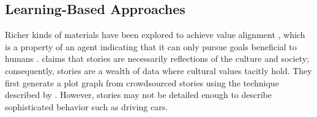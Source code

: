 \documentclass[letterpaper]{article} %
\begin{document}
\subsection{Learning-Based Approaches}
Richer kinds of materials have been explored to achieve value alignment \cite{priority}, which is a property of an agent indicating that it can only pursue goals beneficial to humans \cite{priority,aligning}. \cite{stories} claims that stories are necessarily reflections of the culture and society; consequently, stories are a wealth of data where cultural values tacitly hold. They first generate a plot graph from crowdsourced stories using the technique described by \cite{crowdsourced}. However, stories may not be detailed enough to describe sophisticated behavior such as driving cars.

\end{document}
